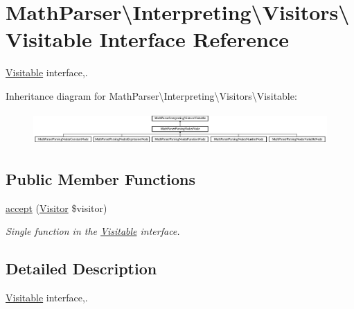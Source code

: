 \hypertarget{interfaceMathParser_1_1Interpreting_1_1Visitors_1_1Visitable}{\section{Math\-Parser\textbackslash{}Interpreting\textbackslash{}Visitors\textbackslash{}Visitable Interface Reference}
\label{interfaceMathParser_1_1Interpreting_1_1Visitors_1_1Visitable}
}


\hyperlink{interfaceMathParser_1_1Interpreting_1_1Visitors_1_1Visitable}{Visitable} interface,.  


Inheritance diagram for Math\-Parser\textbackslash{}Interpreting\textbackslash{}Visitors\textbackslash{}Visitable\-:\begin{figure}[H]
\begin{center}
\leavevmode
\includegraphics[height=1.249071cm]{interfaceMathParser_1_1Interpreting_1_1Visitors_1_1Visitable}
\end{center}
\end{figure}
\subsection*{Public Member Functions}
\begin{DoxyCompactItemize}
\item 
\hyperlink{interfaceMathParser_1_1Interpreting_1_1Visitors_1_1Visitable_a44418d4bae6a68865102c09dc167409f}{accept} (\hyperlink{interfaceMathParser_1_1Interpreting_1_1Visitors_1_1Visitor}{Visitor} \$visitor)
\begin{DoxyCompactList}\small\item\em Single function in the \hyperlink{interfaceMathParser_1_1Interpreting_1_1Visitors_1_1Visitable}{Visitable} interface. \end{DoxyCompactList}\end{DoxyCompactItemize}


\subsection{Detailed Description}
\hyperlink{interfaceMathParser_1_1Interpreting_1_1Visitors_1_1Visitable}{Visitable} interface,. 

